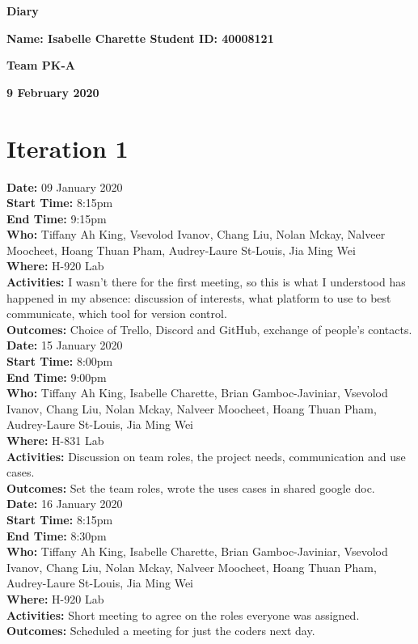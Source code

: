 \documentclass[12pt]{article}
\begin{document}
\vspace*{0.2in}
\centerline{\bf\Large Diary}

\vspace*{0.2in}
\centerline{\bf\Large Name: Isabelle Charette   Student ID: 40008121}

\vspace*{0.2in}
\centerline{\bf\Large Team PK-A}

\vspace*{0.2in}
\centerline{\bf\Large 9 February 2020}

\section{Iteration 1}

{\bf Date:} 09 January 2020\\
{\bf Start Time:} 8:15pm\\
{\bf End Time:} 9:15pm\\
{\bf Who:} Tiffany Ah King, Vsevolod Ivanov, Chang Liu, Nolan Mckay, Nalveer Moocheet, Hoang Thuan Pham, Audrey-Laure St-Louis, Jia Ming Wei\\
{\bf Where:} H-920 Lab \\
{\bf Activities:} I wasn't there for the first meeting, so this is what I understood has happened in my absence: discussion of interests, what platform to use to best communicate, which tool for version control.\\
{\bf Outcomes:} Choice of Trello, Discord and GitHub, exchange of people's contacts.\\

{\bf Date:} 15 January 2020\\
{\bf Start Time:} 8:00pm\\
{\bf End Time:} 9:00pm\\
{\bf Who:} Tiffany Ah King, Isabelle Charette, Brian Gamboc-Javiniar, Vsevolod Ivanov, Chang Liu, Nolan Mckay, Nalveer Moocheet, Hoang Thuan Pham, Audrey-Laure St-Louis, Jia Ming Wei\\
{\bf Where:} H-831 Lab \\
{\bf Activities:} Discussion on team roles, the project needs, communication and use cases.\\
{\bf Outcomes:} Set the team roles, wrote the uses cases in shared google doc.\\

{\bf Date:} 16 January 2020\\
{\bf Start Time:} 8:15pm \\
{\bf End Time:} 8:30pm\\
{\bf Who:} Tiffany Ah King, Isabelle Charette, Brian Gamboc-Javiniar, Vsevolod Ivanov, Chang Liu, Nolan Mckay, Nalveer Moocheet, Hoang Thuan Pham, Audrey-Laure St-Louis, Jia Ming Wei\\
{\bf Where:} H-920 Lab \\
{\bf Activities:} Short meeting to agree on the roles everyone was assigned.\\
{\bf Outcomes:} Scheduled a meeting for just the coders next day.\\
\end{document}
